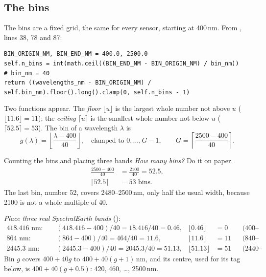 \subsection{The bins}

The bins are a fixed grid, the same for every sensor, starting at 400\,nm. From , lines 38, 78 and 87:
\begin{lstlisting}
BIN_ORIGIN_NM, BIN_END_NM = 400.0, 2500.0
self.n_bins = int(math.ceil((BIN_END_NM - BIN_ORIGIN_NM) / bin_nm))      # bin_nm = 40
return ((wavelengths_nm - BIN_ORIGIN_NM) / self.bin_nm).floor().long().clamp(0, self.n_bins - 1)
\end{lstlisting}
Two functions appear. The \emph{floor} $\lfloor u\rfloor$ is the largest whole number not above $u$ ($\lfloor 11.6\rfloor = 11$); the \emph{ceiling} $\lceil u\rceil$ is the smallest whole number not below $u$ ($\lceil 52.5\rceil = 53$). The bin of a wavelength $\lambda$ is
\begin{equation}\label{eq:specdecoder:bin}
  g(\lambda) = \left\lfloor\frac{\lambda - 400}{40}\right\rfloor, \quad\text{clamped to } 0, \ldots, G - 1,\qquad G = \left\lceil\frac{2500 - 400}{40}\right\rceil .
\end{equation}

\begin{worked}[label={we:specdecoder:bins}]{Counting the bins and placing three bands}
\emph{How many bins?} Do it on paper.
\begin{align*}
  \frac{2500 - 400}{40} &= \frac{2100}{40} = 52.5,\\
  \lceil 52.5\rceil &= 53 \text{ bins}.
\end{align*}
The last bin, number 52, covers 2480--2500\,nm, only half the usual width, because 2100 is not a whole multiple of 40.

\emph{Place three real SpectralEarth bands} ():
\begin{align*}
  418.416\text{ nm}:&\quad (418.416 - 400)/40 = 18.416/40 = 0.46, & \lfloor0.46\rfloor &= 0 & &\text{(400--440 nm)}\\
  864\text{ nm}:&\quad (864 - 400)/40 = 464/40 = 11.6, & \lfloor11.6\rfloor &= 11 & &\text{(840--880 nm)}\\
  2445.3\text{ nm}:&\quad (2445.3 - 400)/40 = 2045.3/40 = 51.13, & \lfloor51.13\rfloor &= 51 & &\text{(2440--2480 nm)}
\end{align*}
Bin $g$ covers $400 + 40g$ to $400 + 40(g + 1)$\,nm, and its centre, used for its tag below, is $400 + 40(g + 0.5)$: 420, 460, \ldots, 2500\,nm.
\end{worked}

